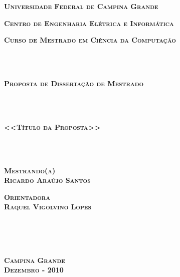 \documentclass[a4paper,titlepage,12pt]{article}
\begin{document}

\pagestyle{empty}

\begin{center}
{\textbf{\Large \textsc{Universidade Federal de Campina Grande}}}
\end{center}

\begin{center}
\textbf{{\Large \textsc{Centro de Engenharia Elétrica e Informática}}}
\end{center}

\begin{center}
{\large \textsc{\textbf{Curso de Mestrado em Ciência da Computação}}}
\end{center}

~\\ \\

\begin{center}
{\LARGE \textsc{\textbf{Proposta de Dissertação de Mestrado}}}
\end{center}

~\\ \\

\begin{center}
{\Large \textsc{\textbf{<<Título da Proposta>>}}}
\end{center}

~\\ \\

\begin{center}
\textbf{\textsc{Mestrando(a)} \\
\textsc{Ricardo Araújo Santos}}
\end{center}

\begin{center}
\textbf{\textsc{Orientadora} \\
\textsc{Raquel Vigolvino Lopes}}
\end{center}

~\\ \\ \\

\begin{center}
\textbf{{\large \textsc{Campina Grande}}
\\
{\large \textsc{Dezembro - 2010}}}
\end{center}

\newpage
\cleardoublepage
\end{document}
